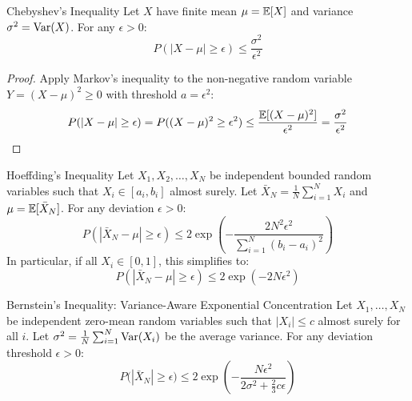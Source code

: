 \begin{theorembox}{Chebyshev's Inequality}
Let $X$ have finite mean $\mu = \operatorname{\mathbb{E}}[X]$ and variance $\sigma^2 = \operatorname{Var}(X)$. For any $\epsilon > 0$:
\begin{equation}
P(|X - \mu| \ge \epsilon) \le \frac{\sigma^2}{\epsilon^2}
\label{eq:chebyshev_ineq}
\end{equation}
\end{theorembox}

\begin{proof}
Apply Markov's inequality to the non-negative random variable $Y = (X - \mu)^2 \ge 0$ with threshold $a = \epsilon^2$:
\begin{equation}
P(|X - \mu| \ge \epsilon) = P((X - \mu)^2 \ge \epsilon^2) \le \frac{\operatorname{\mathbb{E}}[(X - \mu)^2]}{\epsilon^2} = \frac{\sigma^2}{\epsilon^2}
\end{equation}
\end{proof}

\begin{theorembox}{Hoeffding's Inequality}
Let $X_1, X_2, \dots, X_N$ be independent bounded random variables such that $X_i \in [a_i, b_i]$ almost surely. Let $\bar{X}_N = \frac{1}{N}\sum_{i=1}^N X_i$ and $\mu = \operatorname{\mathbb{E}}[\bar{X}_N]$. For any deviation $\epsilon > 0$:
\begin{equation}
P(|\bar{X}_N - \mu| \ge \epsilon) \le 2 \exp\left( -\frac{2N^2 \epsilon^2}{\sum_{i=1}^N (b_i - a_i)^2} \right)
\label{eq:hoeffding_ineq}
\end{equation}
In particular, if all $X_i \in [0, 1]$, this simplifies to:
\begin{equation}
P(|\bar{X}_N - \mu| \ge \epsilon) \le 2 \exp\left( -2N\epsilon^2 \right)
\end{equation}
\end{theorembox}

\begin{theorembox}{Bernstein's Inequality: Variance-Aware Exponential Concentration}
Let $X_1, \dots, X_N$ be independent zero-mean random variables such that $|X_i| \le c$ almost surely for all $i$. Let $\sigma^2 = \frac{1}{N}\sum_{i=1}^N \operatorname{Var}(X_i)$ be the average variance. For any deviation threshold $\epsilon > 0$:
\begin{equation}
P\big( |\bar{X}_N| \ge \epsilon \big) \le 2 \exp\left( -\frac{N \epsilon^2}{2\sigma^2 + \frac{2}{3}c\epsilon} \right)
\label{eq:bernstein_ineq}
\end{equation}
\end{theorembox}

